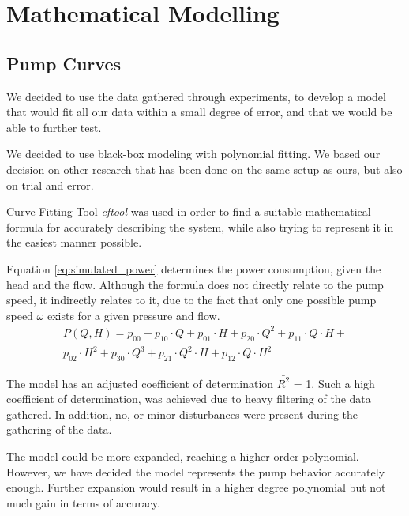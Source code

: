 \chapter{Mathematical Modelling}\label{ch:mathmodel}

\section{Pump Curves}\label{sec:pumpcurves}


We decided to use the data gathered through experiments, to develop a model that would fit all our data within a small degree of error, 
and that we would be able to further test.

We decided to use black-box modeling with polynomial fitting. We based our decision on other research that has been done on the same
setup as ours, but also on trial and error.

Curve Fitting Tool \cite{cftool} \textit{cftool} was used in order to find a suitable mathematical formula for accurately describing the 
system, while also trying to represent it in the easiest manner possible. 

Equation \ref{eq:simulated_power} determines the power consumption, given the head and the flow. Although the formula does not directly
relate to the pump speed, it indirectly relates to it, due to the fact that only one possible pump speed $\omega$ exists for a given
pressure and flow.
\begin{multline}
		P(Q,H) = p_{00} + p_{10} \cdot Q + p_{01} \cdot H + p_{20} \cdot Q^2 + p_{11} \cdot Q \cdot H + \\
		p_{02} \cdot H^2 + p_{30} \cdot Q ^ 3 + p_{21} \cdot Q^2 \cdot H + p_{12} \cdot Q \cdot H^2
		\label{eq:simulated_power}
\end{multline}

The model has an adjusted coefficient of determination  $\bar{R^2}$ = 1. Such a high coefficient of determination, was achieved due to
heavy filtering of the data gathered. In addition, no, or minor disturbances were present during the gathering of the data.

The model could be more expanded, reaching a higher order polynomial. However, we have decided the model represents the pump behavior 
accurately enough. Further expansion would result in a higher degree polynomial but not much gain in terms of accuracy.

